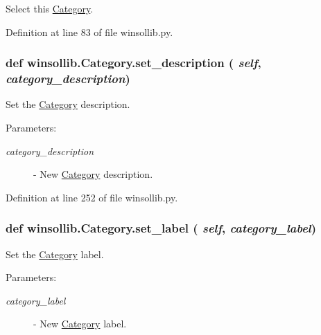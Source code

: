 Select this \hyperlink{classwinsollib_1_1Category}{Category}. 



Definition at line 83 of file winsollib.py.\hypertarget{classwinsollib_1_1Category_c1ebe25d537e9c7c9482e397dbf4deed}{
\subsubsection[set\_\-description]{\setlength{\rightskip}{0pt plus 5cm}def winsollib.Category.set\_\-description ( {\em self},  {\em category\_\-description})}}
\label{classwinsollib_1_1Category_c1ebe25d537e9c7c9482e397dbf4deed}


Set the \hyperlink{classwinsollib_1_1Category}{Category} description. 

\begin{Desc}
\item[Parameters:]
\begin{description}
\item[{\em category\_\-description}]- New \hyperlink{classwinsollib_1_1Category}{Category} description. \end{description}
\end{Desc}


Definition at line 252 of file winsollib.py.\hypertarget{classwinsollib_1_1Category_ab90d2aa598aa694daf1d46651e52e97}{
\subsubsection[set\_\-label]{\setlength{\rightskip}{0pt plus 5cm}def winsollib.Category.set\_\-label ( {\em self},  {\em category\_\-label})}}
\label{classwinsollib_1_1Category_ab90d2aa598aa694daf1d46651e52e97}


Set the \hyperlink{classwinsollib_1_1Category}{Category} label. 

\begin{Desc}
\item[Parameters:]
\begin{description}
\item[{\em category\_\-label}]- New \hyperlink{classwinsollib_1_1Category}{Category} label. \end{description}
\end{Desc}


